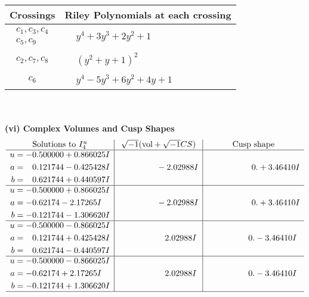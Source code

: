 \documentclass[1p]{elsarticle_modified}
\theoremstyle{definition}
\newcommand{\I}{\sqrt{-1}}
\begin{document}
\begin{tabular}{m{50pt}|m{274pt}}
Crossings & \hspace{64pt}Riley Polynomials at each crossing \\
\hline $$\begin{aligned}c_{1},c_{3},c_{4}\\c_{5},c_{9}\end{aligned}$$&$\begin{aligned}
&y^4+3 y^3+2 y^2+1
\end{aligned}$\\
\hline $$\begin{aligned}c_{2},c_{7},c_{8}\end{aligned}$$&$\begin{aligned}
&(y^2+y+1)^2
\end{aligned}$\\
\hline $$\begin{aligned}c_{6}\end{aligned}$$&$\begin{aligned}
&y^4-5 y^3+6 y^2+4 y+1
\end{aligned}$\\
\hline
\end{tabular}\\~\\
\newpage\flushleft \textbf{(vi) Complex Volumes and Cusp Shapes}
$$\begin{array}{c|c|c}  
\text{Solutions to }I^u_{4}& \I (\text{vol} + \sqrt{-1}CS) & \text{Cusp shape}\\
 \hline 
\begin{aligned}
u &= -0.500000 + 0.866025 I \\
a &= \phantom{-}0.121744 - 0.425428 I \\
b &= \phantom{-}0.621744 + 0.440597 I\end{aligned}
 & \phantom{-0.000000 } -2.02988 I & \phantom{-0.000000 -}0. + 3.46410 I \\ \hline\begin{aligned}
u &= -0.500000 + 0.866025 I \\
a &= -0.62174 - 2.17265 I \\
b &= -0.121744 - 1.306620 I\end{aligned}
 & \phantom{-0.000000 } -2.02988 I & \phantom{-0.000000 -}0. + 3.46410 I \\ \hline\begin{aligned}
u &= -0.500000 - 0.866025 I \\
a &= \phantom{-}0.121744 + 0.425428 I \\
b &= \phantom{-}0.621744 - 0.440597 I\end{aligned}
 & \phantom{-0.000000 -}2.02988 I & \phantom{-0.000000 } 0. - 3.46410 I \\ \hline\begin{aligned}
u &= -0.500000 - 0.866025 I \\
a &= -0.62174 + 2.17265 I \\
b &= -0.121744 + 1.306620 I\end{aligned}
 & \phantom{-0.000000 -}2.02988 I & \phantom{-0.000000 } 0. - 3.46410 I\\
 \hline 
 \end{array}$$\newpage\newpage\renewcommand{\arraystretch}{1}
\end{document}
